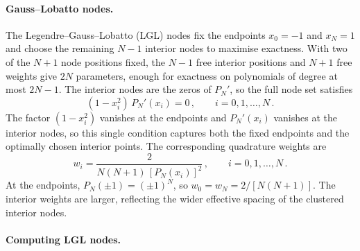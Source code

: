 \paragraph{Gauss--Lobatto nodes.}

The Legendre--Gauss--Lobatto (LGL) nodes fix the endpoints
$x_0 = -1$ and $x_N = 1$ and choose the remaining $N - 1$ interior
nodes to maximise exactness.  With two of the $N + 1$ node positions
fixed, the $N - 1$ free interior positions and $N + 1$ free weights
give $2N$ parameters, enough for exactness on polynomials of degree
at most $2N - 1$.  The interior nodes are the zeros of $P_N'$, so the
full node set satisfies
%
\begin{equation}
  (1 - x_i^2)\,P_N'(x_i) = 0 \,,
  \qquad i = 0, 1, \ldots, N \,.
  \label{eq:lgl-nodes}
\end{equation}
%
The factor $(1 - x_i^2)$ vanishes at the endpoints and $P_N'(x_i)$
vanishes at the interior nodes, so this single condition captures
both the fixed endpoints and the optimally chosen interior points.
The corresponding quadrature weights are
%
\begin{equation}
  w_i = \frac{2}{N(N+1)\,[P_N(x_i)]^2} \,,
  \qquad i = 0, 1, \ldots, N \,.
  \label{eq:lgl-weights}
\end{equation}
%
At the endpoints, $P_N(\pm 1) = (\pm 1)^N$, so
$w_0 = w_N = 2/[N(N+1)]$.  The interior weights are larger,
reflecting the wider effective spacing of the clustered interior
nodes.

\paragraph{Computing LGL nodes.}

